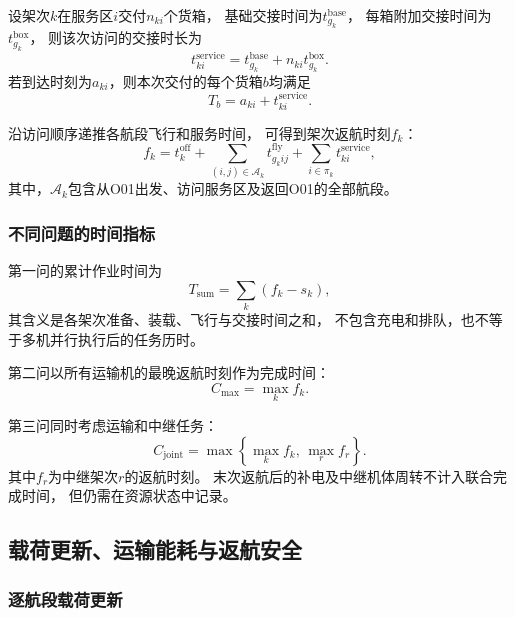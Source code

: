 \documentclass[bwprint]{gmcmthesis}
\begin{document}
设架次$k$在服务区$i$交付$n_{ki}$个货箱，
基础交接时间为$t_{g_k}^{\mathrm{base}}$，
每箱附加交接时间为$t_{g_k}^{\mathrm{box}}$，
则该次访问的交接时长为
\begin{equation}
    t_{ki}^{\mathrm{service}}
    =
    t_{g_k}^{\mathrm{base}}
    +n_{ki}t_{g_k}^{\mathrm{box}}.
\end{equation}
若到达时刻为$a_{ki}$，则本次交付的每个货箱$b$均满足
\begin{equation}
    T_b
    =
    a_{ki}+t_{ki}^{\mathrm{service}}.
\end{equation}

沿访问顺序递推各航段飞行和服务时间，
可得到架次返航时刻$f_k$：
\begin{equation}
    f_k
    =
    t_k^{\mathrm{off}}
    +
    \sum_{(i,j)\in\mathcal{A}_k}
    t_{g_kij}^{\mathrm{fly}}
    +
    \sum_{i\in\pi_k}
    t_{ki}^{\mathrm{service}},
\end{equation}
其中，$\mathcal{A}_k$包含从O01出发、访问服务区及返回O01的全部航段。

\subsubsection{不同问题的时间指标}

第一问的累计作业时间为
\begin{equation}
    T_{\mathrm{sum}}
    =
    \sum_k(f_k-s_k),
\end{equation}
其含义是各架次准备、装载、飞行与交接时间之和，
不包含充电和排队，也不等于多机并行执行后的任务历时。

第二问以所有运输机的最晚返航时刻作为完成时间：
\begin{equation}
    C_{\max}
    =
    \max_k f_k.
\end{equation}

第三问同时考虑运输和中继任务：
\begin{equation}
    C_{\mathrm{joint}}
    =
    \max\left\{
    \max_k f_k,\,
    \max_r f_r
    \right\}.
\end{equation}
其中$f_r$为中继架次$r$的返航时刻。
末次返航后的补电及中继机体周转不计入联合完成时间，
但仍需在资源状态中记录。

\subsection{载荷更新、运输能耗与返航安全}

\subsubsection{逐航段载荷更新}
\end{document}
